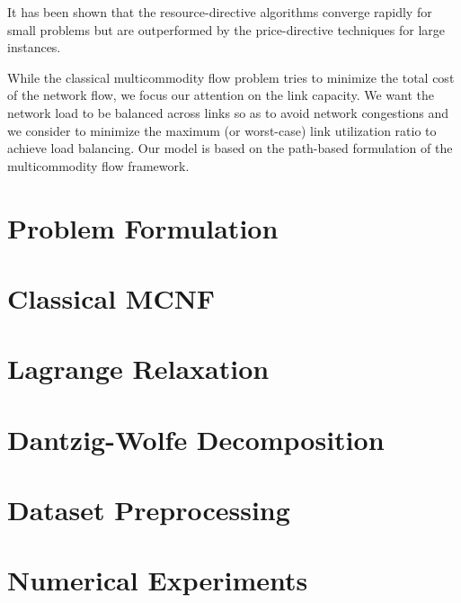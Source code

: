 \documentclass{article}
\begin{document}
It has been shown that the resource-directive algorithms converge rapidly
for small problems but are outperformed by the price-directive techniques for large instances. 

While the classical multicommodity flow problem tries to minimize the total cost of the network flow, we focus our attention on the link capacity. We want the network load to be balanced across links so as to avoid network congestions and we consider to minimize the maximum (or worst-case) link utilization ratio to achieve load balancing. Our model is based on the path-based formulation of the multicommodity flow framework.

\section{Problem Formulation}


\section{Classical MCNF}


\section{Lagrange Relaxation}


\section{Dantzig-Wolfe Decomposition}



\section{Dataset Preprocessing}


\section{Numerical Experiments}




\appendix
\end{document}
